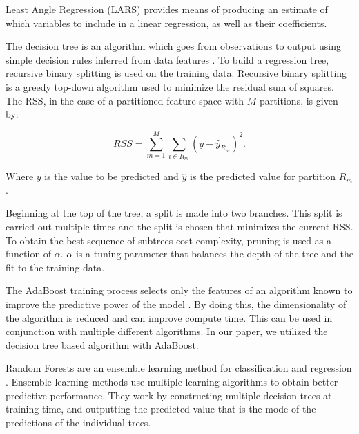 \documentclass[final,3p,times,twocolumn,numbers]{elsarticle}
\begin{document}
Least Angle Regression (LARS) provides means of producing an estimate of which variables to include in a linear regression, as well as their coefficients.


%



 The decision tree is an algorithm which goes from observations to output using simple decision rules inferred from data features \cite{Quinlan}. To build a regression tree, recursive binary splitting is used on the training data. Recursive binary splitting is a greedy top-down algorithm used to minimize the residual sum of squares. The RSS, in the case of a partitioned feature space with $M$ partitions, is given by:

\begin{equation}
    RSS=\sum^M_{m=1}\sum_{i\in R_m}(y-\hat{y}_{R_m})^2.
\end{equation}

\noindent Where $y$ is the value to be predicted and $\hat{y}$ is the predicted value for partition $R_m$.



Beginning at the top of the tree, a split is made into two branches. This split is carried out multiple times and the split is chosen that minimizes the current RSS. To obtain the best sequence of subtrees cost complexity, pruning is used as a function of $\alpha$. $\alpha$ is a tuning parameter that balances the depth of the tree and the fit to the training data.


The AdaBoost training process selects only the features of an algorithm known to improve the predictive power of the model \cite{Freund1997}. By doing this, the dimensionality of the algorithm is reduced and can improve compute time. This can be used in conjunction with multiple different algorithms. In our paper, we utilized the decision tree based algorithm with AdaBoost.


Random Forests are an ensemble learning method for classification and regression \cite{Breiman2001}. Ensemble learning methods use multiple learning algorithms to obtain better predictive performance. They work by constructing multiple decision trees at training time, and outputting the predicted value that is the mode of the predictions of the individual trees.
\end{document}
